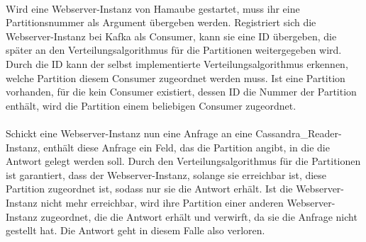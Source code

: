 \\
Wird eine Webserver-Instanz von Hamaube gestartet, muss ihr eine Partitionsnummer als Argument übergeben werden. Registriert sich die Webserver-Instanz bei Kafka als Consumer, kann sie eine ID übergeben, die später an den Verteilungsalgorithmus für die Partitionen weitergegeben wird. Durch die ID kann der selbst implementierte Verteilungsalgorithmus erkennen, welche Partition diesem Consumer zugeordnet werden muss. Ist eine Partition vorhanden, für die kein Consumer existiert, dessen ID die Nummer der Partition enthält, wird die Partition einem beliebigen Consumer zugeordnet.\\
\\
Schickt eine Webserver-Instanz nun eine Anfrage an eine Cassandra\_Reader-Instanz, enthält diese Anfrage ein Feld, das die Partition angibt, in die die Antwort gelegt werden soll. Durch den Verteilungsalgorithmus für die Partitionen ist garantiert, dass der Webserver-Instanz, solange sie erreichbar ist, diese Partition zugeordnet ist, sodass nur sie die Antwort erhält. Ist die Webserver-Instanz nicht mehr erreichbar, wird ihre Partition einer anderen Webserver-Instanz zugeordnet, die die Antwort erhält und verwirft, da sie die Anfrage nicht gestellt hat. Die Antwort geht in diesem Falle also verloren.

